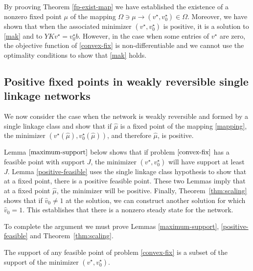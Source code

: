 \documentclass[smallextended]{svjour3}       %
\newcommand*{\0}{\mathbf{0}}
\newcommand*{\1}{\mathbf{1}}
\begin{document}
By prooving Theorem \ref{fp-exist-map} we have established the existence of a
nonzero fixed point $\mu$ of the mapping $\Omega \ni \mu \rightarrow
(v^\star,v^\star_0)\in \Omega$. Moreover, we have shown that when the
associated minimizer $(v^\star,v^\star_0)$ is positive, it is a solution to
\eqref{mak} and to $YKv^\star=v^\star_0b$.  However, in the case when some
entries of $v^\star$ are zero, the objective function of \eqref{convex-fix} is
non-differentiable and we cannot use the optimality conditions to show that
\eqref{mak} holds. 


\subsection{Positive fixed points in weakly reversible single linkage networks}  
\label{section:single-linkage}

We now consider the case when the network is weakly reversible and formed by a single
linkage class and show that if $\hat \mu$ is a fixed point of the
mapping \eqref{mapping}, the minimizer $(v^\star(\hat
\mu),v^\star_0(\hat\mu))$, and therefore $\hat\mu$, is positive.

Lemma $\ref{maximum-support}$ below shows that if problem $\eqref{convex-fix}$ has a
feasible point with support $J$, the minimizer $(v^\star,v^\star_0)$ will have
support at least $J$. Lemma \ref{positive-feasible} uses the single
linkage class hypothesis to show that at a fixed point, there is a
positive feasible point.  These two Lemmas imply that at a fixed point
$\hat{\mu}$, the minimizer will be positive.  Finally, Theorem~\ref{thm:scaling}
shows that if $\hat{v}_0 \neq 1$ at the solution, we can construct another
solution for which $\hat{v}_0=1$. This establishes that there is a nonzero
steady state for the network. 

To complete the argument we must prove Lemmas \ref{maximum-support},
\ref{positive-feasible} and Theorem~\ref{thm:scaling}.

\begin{lemma} 
	The support of any feasible point of problem \eqref{convex-fix} is a subset
	of the support of the minimizer $(v^\star,v^\star_0)$. 
	\label{maximum-support}
\end{lemma}
\end{document}
